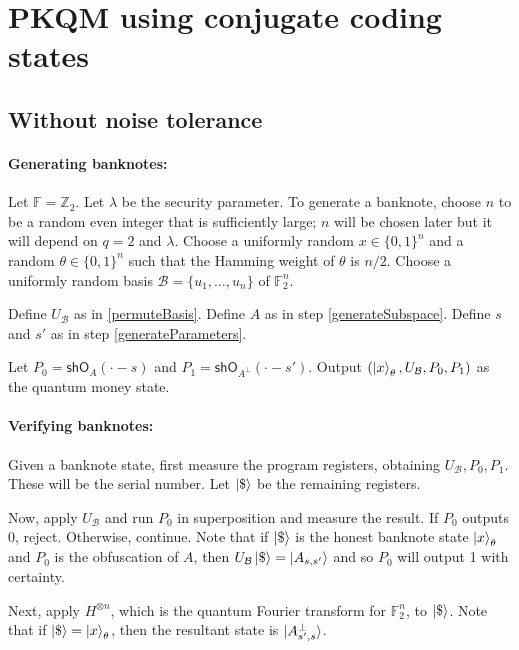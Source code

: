 \documentclass[12pt,letterpaper]{article}
\theoremstyle{definition}
\theoremstyle{remark}
\begin{document}

\section{PKQM using conjugate coding states}

\subsection{Without noise tolerance}

\paragraph{Generating banknotes:} Let $\mathbb{F}=\mathbb{Z}_2$. Let $\lambda$ be the security parameter. To generate a banknote, choose $n$ to be a random even integer that is sufficiently large; $n$ will be chosen later but it will depend on $q=2$ and $\lambda$. Choose a uniformly random $x \in \{0,1\}^n$ and a random $\theta \in \{0,1\}^n$ such that the Hamming weight of $\theta$ is $n/2$. Choose a uniformly random basis $\mathcal{B}=\{u_1, \ldots, u_n\}$ of $\mathbb{F}^n_2$.

Define $U_\mathcal{B}$ as in \cref{permuteBasis}. Define $A$ as in step \eqref{generateSubspace}. Define $s$ and $s'$ as in step \eqref{generateParameters}.

Let $P_0 = \textsf{shO}_A(\cdot -s)$ and $P_1 = \textsf{shO}_{A^\perp}(\cdot - s')$. Output $(\ket{x}_{\theta}, U_\mathcal{B}, P_0, P_1)$ as the quantum money state.

\paragraph{Verifying banknotes:} Given a banknote state, first measure the program registers, obtaining $U_\mathcal{B}, P_0, P_1$. These will be the serial number. Let $\ket{\$}$ be the remaining registers.

Now, apply $U_\mathcal{B}$ and run $P_0$ in superposition and measure the result. If $P_0$ outputs 0, reject. Otherwise, continue. Note that if $\ket{\$}$ is the honest banknote state $\ket{x}_{\theta}$ and $P_0$ is the obfuscation of $A$, then $U_{\mathcal{B}}\ket{\$}=\ket{A_{s,s'}}$ and so $P_0$ will output 1 with certainty.

Next, apply $H^{\otimes n}$, which is the quantum Fourier transform for $\mathbb{F}^n_2$, to $\ket{\$}$. Note that if $\ket{\$}=\ket{x}_\theta$, then the resultant state is $\ket{A^{\perp}_{s',s}}$.
\end{document}
